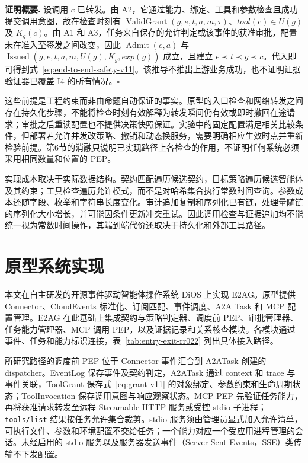 \noindent\textbf{证明概要.}
设调用 $c$ 已转发。由 A2，它通过能力、绑定、工具和参数检查且成功提交调用意图，故在检查时刻有 $\operatorname{ValidGrant}(g,e,t,a,m,\tau)$、$tool(c)\in U(g)$ 及 $K_g(c)$。由 A1 和 A3，任务来自保存的允许判定或该事件的获准审批，配置未在准入至签发之间改变，因此 $\operatorname{Admit}(e,a)$ 与 $\operatorname{Issued}(g,e,t,a,m,U(g),K_g,exp(g))$ 成立，且建立 $e\prec t\prec g\prec c$。代入即可得到式~\eqref{eq:end-to-end-safety-v11}。该推导不推出上游业务成功，也不证明证据验证器已覆盖 I4 的所有情况。\hfill$\square$

这些前提是工程约束而非由命题自动保证的事实。原型的入口检查和网络转发之间存在持久化步骤，不能将检查时刻有效解释为转发瞬间仍有效或即时撤回在途请求；审批之后重读配置也不提供决策快照保证。实验中的固定配置满足相关比较条件，但部署若允许并发改策略、撤销和动态换服务，需要明确相应生效时点并重新检验前提。第6节的消融只说明已实现路径上各检查的作用，不证明任何系统必须采用相同数量和位置的 PEP。

实现成本取决于实际数据结构。契约匹配遍历候选契约，目标策略遍历候选智能体及其约束；工具检查遍历允许模式，而不是对哈希集合执行常数时间查询。参数成本还随字段、枚举和字符串长度变化。审计追加复制和序列化已有链，处理量随链的序列化大小增长，并可能因条件更新冲突重试。因此调用检查与证据追加均不能统一视为常数时间操作，其端到端代价还取决于持久化和外部工具路径。

\section{原型系统实现}\label{sec:implementation-v11}

本文在自主研发的开源事件驱动智能体操作系统 DiOS 上实现 E2AG。原型提供 Connector、CloudEvents 标准化、订阅匹配、事件调度、A2A Task 和 MCP 配置管理。E2AG 在此基础上集成契约与策略判定器、调度前 PEP、审批管理器、任务能力管理器、MCP 调用 PEP，以及证据记录和关系核查模块。各模块通过事件、任务和能力标识连接，表~\ref{tab:entry-exit-rr022} 列出具体接入路径。

所研究路径的调度前 PEP 位于 Connector 事件汇合到 A2ATask 创建的 dispatcher。EventLog 保存事件及契约判定，A2ATask 通过 context 和 trace 与事件关联，ToolGrant 保存式~\eqref{eq:grant-v11} 的对象绑定、参数约束和生命周期状态；ToolInvocation 保存调用意图与响应观察状态。MCP PEP 先验证任务能力，再将获准请求转发至远程 Streamable HTTP 服务或受控 stdio 子进程；\texttt{tools/list} 结果按任务允许集合裁剪。stdio 服务须由管理员显式加入允许清单，可执行文件、参数和环境配置不交给任务；一个能力对应一个受应用进程管理的会话。未经启用的 stdio 服务以及服务器发送事件（Server-Sent Events，SSE）类传输不下发配置。

